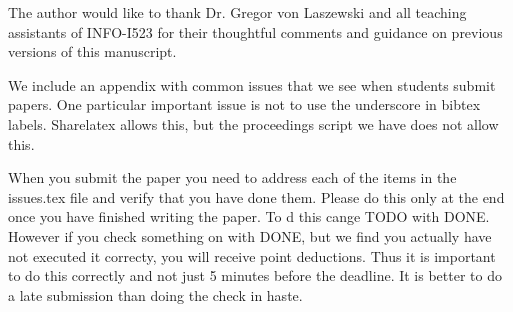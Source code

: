 \documentclass[sigconf]{acmart}
\begin{document}
\begin{acks}

The author would like to thank Dr. Gregor von Laszewski and all teaching assistants of INFO-I523 for their thoughtful comments and guidance on previous versions of this manuscript.

\end{acks}


 

\appendix

We include an appendix with common issues that we see when students
submit papers. One particular important issue is not to use the
underscore in bibtex labels. Sharelatex allows this, but the
proceedings script we have does not allow this.

When you submit the paper you need to address each of the items in the
issues.tex file and verify that you have done them. Please do this
only at the end once you have finished writing the paper. To d this
cange TODO with DONE. However if you check something on with DONE, but
we find you actually have not executed it correcty, you will receive
point deductions. Thus it is important to do this correctly and not
just 5 minutes before the deadline. It is better to do a late
submission than doing the check in haste. 


\end{document}

